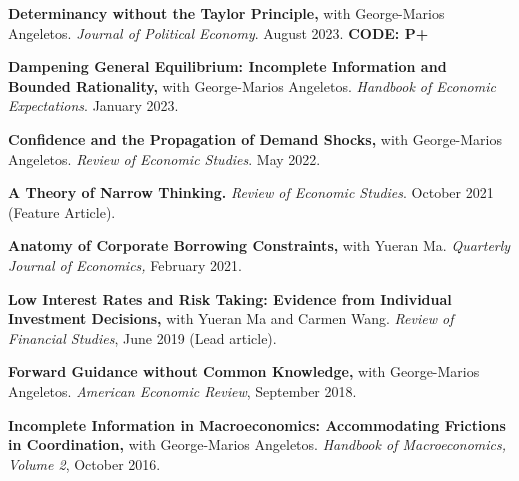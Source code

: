 \documentclass[line]{res}
\newenvironment{list1}{
  \begin{list}{\ding{113}}{%
      \setlength{\itemsep}{0.07in}
      \setlength{\parsep}{0in} \setlength{\parskip}{0in}
		\setlength{\topsep}{0.07in} \setlength{\partopsep}{0in} 
      \setlength{\leftmargin}{0.0in}}}{\end{list}}
\begin{document}
\begin{resume}
\begin{list1}
\item[] \textbf{Determinancy without the Taylor Principle,} with George-Marios Angeletos. \emph{Journal of Political Economy}. August 2023.
\textbf{CODE:  P+}
\vspace{0.2cm}

\item[] \textbf{Dampening General Equilibrium: Incomplete Information and Bounded Rationality,} with George-Marios Angeletos. \emph{Handbook of Economic Expectations}. January 2023.

\vspace{0.2cm}

\item[] \textbf{Confidence and the Propagation of Demand Shocks,} with George-Marios Angeletos. \emph{Review of Economic Studies}. May 2022.
\vspace{0.2cm}

\item[] \textbf{A Theory of Narrow Thinking.}  \emph{Review of Economic Studies}. October 2021 (Feature Article).
\vspace{0.2cm}


\item[] \textbf{Anatomy of Corporate Borrowing Constraints,} with Yueran Ma. \emph{Quarterly Journal of Economics,} February 2021.
\vspace{0.2cm}
\item[] \textbf{Low Interest Rates and Risk Taking: Evidence from Individual Investment Decisions,} with Yueran Ma and Carmen Wang. \emph{Review of Financial Studies}, June 2019 (Lead article).
\vspace{0.2cm}

\item[] \textbf{Forward Guidance without Common Knowledge,} with George-Marios Angeletos. \emph{American Economic Review}, September 2018.
\vspace{0.2cm}

\item[]
\textbf{Incomplete Information in Macroeconomics: Accommodating Frictions in Coordination,} with George-Marios Angeletos. \emph{Handbook of Macroeconomics, Volume 2}, October 2016.

\end{list1}







\end{resume}
\end{document}
